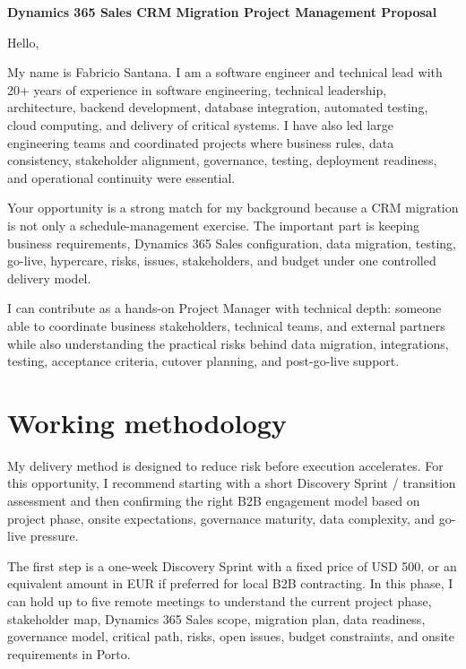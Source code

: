 \documentclass[11pt,a4paper]{article}
\begin{document}
\begin{center}
{\LARGE\bfseries Dynamics 365 Sales CRM Migration Project Management Proposal}
\end{center}
\vspace{0.5em}

Hello,\par

My name is Fabricio Santana. I am a software engineer and technical lead with 20+ years of experience in software engineering, technical leadership, architecture, backend development, database integration, automated testing, cloud computing, and delivery of critical systems. I have also led large engineering teams and coordinated projects where business rules, data consistency, stakeholder alignment, governance, testing, deployment readiness, and operational continuity were essential.\par

Your opportunity is a strong match for my background because a CRM migration is not only a schedule-management exercise. The important part is keeping business requirements, Dynamics 365 Sales configuration, data migration, testing, go-live, hypercare, risks, issues, stakeholders, and budget under one controlled delivery model.\par

I can contribute as a hands-on Project Manager with technical depth: someone able to coordinate business stakeholders, technical teams, and external partners while also understanding the practical risks behind data migration, integrations, testing, acceptance criteria, cutover planning, and post-go-live support.\par

\section*{Working methodology}

My delivery method is designed to reduce risk before execution accelerates. For this opportunity, I recommend starting with a short Discovery Sprint / transition assessment and then confirming the right B2B engagement model based on project phase, onsite expectations, governance maturity, data complexity, and go-live pressure.\par

The first step is a one-week Discovery Sprint with a fixed price of USD 500, or an equivalent amount in EUR if preferred for local B2B contracting. In this phase, I can hold up to five remote meetings to understand the current project phase, stakeholder map, Dynamics 365 Sales scope, migration plan, data readiness, governance model, critical path, risks, open issues, budget constraints, and onsite requirements in Porto.\par
\end{document}
